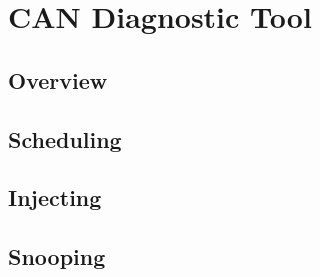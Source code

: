 \section{CAN Diagnostic Tool}
\label{sec:implementation_candt}

\subsection{Overview}

\subsection{Scheduling}

\subsection{Injecting}

\subsection{Snooping}
